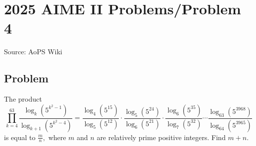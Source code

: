 \documentclass[12pt]{article}
\begin{document}
\section*{{2025 AIME II Problems/Problem 4}}
Source: AoPS Wiki

\subsection*{Problem}
The product \[\prod^{63}_{k=4} \frac{\log_k (5^{k^2 - 1})}{\log_{k + 1} (5^{k^2 - 4})} = \frac{\log_4 (5^{15})}{\log_5 (5^{12})} \cdot \frac{\log_5 (5^{24})}{\log_6 (5^{21})}\cdot \frac{\log_6 (5^{35})}{\log_7 (5^{32})} \cdots \frac{\log_{63} (5^{3968})}{\log_{64} (5^{3965})}\] is equal to $\tfrac mn,$ where $m$ and $n$ are relatively prime positive integers. Find $m + n.$
\end{document}

